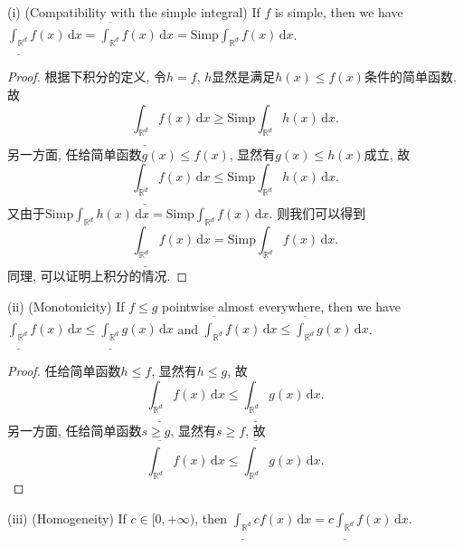 \documentclass[reqno,a4paper,10pt]{amsart}
\newcommand\dif{\,\mathrm{d}}
\newcommand\Rnum{\mathbb{R}}
\begin{document}
(i) (Compatibility with the simple integral) If $f$ is simple, then we have $\underline{\int_{\Rnum^d}} f(x)\dif x =  \overline{\int_{\Rnum^d}} f(x)\dif x= \mathrm{Simp}\int_{\Rnum^d} f(x)\dif x$.
\begin{proof}
    根据下积分的定义, 令$h=f$, $h$显然是满足$h(x)\leq f(x)$条件的简单函数. 故
    \begin{equation*}
        \underline{\int_{\Rnum^d}} f(x)\dif x\geq \mathrm{Simp}\int_{\Rnum^d} h(x)\dif x.
    \end{equation*}
    另一方面, 任给简单函数$g(x)\leq f(x)$, 显然有$g(x)\leq h(x)$成立, 故
    \begin{equation*}
        \underline{\int_{\Rnum^d}} f(x)\dif x\leq \mathrm{Simp}\int_{\Rnum^d} h(x)\dif x.
    \end{equation*}
    又由于$\mathrm{Simp}\int_{\Rnum^d} h(x)\dif x=\mathrm{Simp}\int_{\Rnum^d} f(x)\dif x$. 则我们可以得到
    \begin{equation*}
        \underline{\int_{\Rnum^d}} f(x)\dif x=\mathrm{Simp}\int_{\Rnum^d} f(x)\dif x.
    \end{equation*}
    同理, 可以证明上积分的情况. 
\end{proof}
(ii) (Monotonicity) If $f\leq g$ pointwise almost everywhere, then we have $\underline{\int_{\Rnum^d}}f(x)\dif x\leq \underline{\int_{\Rnum^d}}g(x)\dif x$ and $\overline{\int_{\Rnum^d}}f(x)\dif x\leq \overline{\int_{\Rnum^d}}g(x)\dif x$.
\begin{proof}
    任给简单函数$h\leq f$, 显然有$h\leq g$, 故
    \begin{equation*}
        \underline{\int_{\Rnum^d}}f(x)\dif x\leq \underline{\int_{\Rnum^d}}g(x)\dif x.
    \end{equation*}
    另一方面, 任给简单函数$s\geq g$, 显然有$s\geq f$, 故
    \begin{equation*}
        \overline{\int_{\Rnum^d}}f(x)\dif x\leq \overline{\int_{\Rnum^d}}g(x)\dif x.
    \end{equation*}
\end{proof}
(iii) (Homogeneity) If $c\in [0,+\infty)$, then $\underline{\int_{\Rnum^d}}cf(x)\dif x=c\underline{\int_{\Rnum^d}}f(x)\dif x$.
\end{document}
